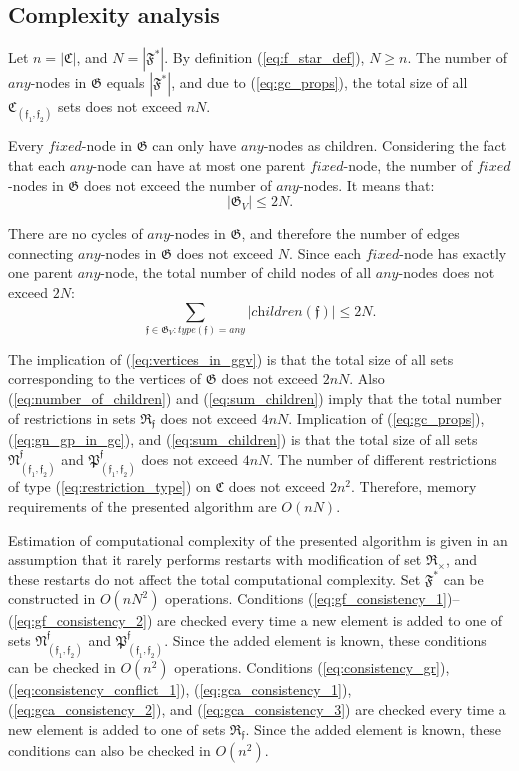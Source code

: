 \documentclass[times, 10pt,twocolumn]{article}
\newcommand{\gC}{\mathfrak{C}}
\newcommand{\gF}{\mathfrak{F}}
\newcommand{\gG}{\mathfrak{G}}
\newcommand{\gR}{\mathfrak{R}}
\newcommand{\gN}{\mathfrak{N}}
\newcommand{\gP}{\mathfrak{P}}
\newcommand{\gf}{\mathfrak{f}}
\newcommand{\gFs}{\gF^*}
\newcommand{\any}{\textit{any}}
\newcommand{\fixed}{\textit{fixed}}
\newcommand{\children}{\textit{children}}
\newcommand{\type}{\textit{type}}
\begin{document}
\subsection{Complexity analysis}

Let $n = |\gC|$, and $N = |\gFs|$.
By definition (\ref{eq:f_star_def}), $N \ge n$.
The number of $\any$-nodes in $\gG$ equals $|\gFs|$,
and due to (\ref{eq:gc_props}),
the total size of all $\gC_{(\gf_1, \gf_2)}$ sets does not exceed $nN$.

Every $\fixed$-node in $\gG$ can only have $\any$-nodes as children. Considering the fact that each $\any$-node can have at most one parent $\fixed$-node, the number of $\fixed$-nodes in $\gG$ does not exceed the number of $\any$-nodes. It means that:
\begin{equation}\label{eq:vertices_in_ggv}
|\gG_V| \le 2N \text{.}
\end{equation}

There are no cycles of $\any$-nodes in $\gG$,
and therefore the number of edges connecting $\any$-nodes in $\gG$
does not exceed $N$.
Since each $\fixed$-node has exactly one parent $\any$-node,
the total number of child nodes of all $\any$-nodes does not exceed $2N$:
\begin{equation}\label{eq:sum_children}
\sum_{\gf \in \gG_V: \type(\gf) = \any} |\children(\gf)| \le 2N \text{.}
\end{equation}

The implication of (\ref{eq:vertices_in_ggv})
is that the total size of all sets corresponding to the vertices of $\gG$
does not exceed $2nN$.
Also (\ref{eq:number_of_children}) and (\ref{eq:sum_children}) imply
that the total number of restrictions in sets $\gR_{\gf}$ does not exceed $4nN$.
Implication of (\ref{eq:gc_props}), (\ref{eq:gn_gp_in_gc}),
and (\ref{eq:sum_children}) is that the total size
of all sets $\gN^{\gf}_{(\gf_1, \gf_2)}$ and $\gP^{\gf}_{(\gf_1, \gf_2)}$
does not exceed $4nN$.
The number of different restrictions of type (\ref{eq:restriction_type})
on $\gC$ does not exceed $2n^2$.
Therefore, memory requirements of the presented algorithm are $O(nN)$.

Estimation of computational complexity of the presented algorithm is given
in an assumption that it rarely performs restarts
with modification of set $\gR_{\times}$,
and these restarts do not affect the total computational complexity.
Set $\gFs$ can be constructed in $O(nN^2)$ operations.
Conditions (\ref{eq:gf_consistency_1})--(\ref{eq:gf_consistency_2})
are checked every time a new element is added to one
of sets $\gN^{\gf}_{(\gf_1, \gf_2)}$ and $\gP^{\gf}_{(\gf_1, \gf_2)}$.
Since the added element is known,
these conditions can be checked in $O(n^2)$ operations.
Conditions (\ref{eq:consistency_gr}), (\ref{eq:consistency_conflict_1}),
(\ref{eq:gca_consistency_1}), (\ref{eq:gca_consistency_2}),
and (\ref{eq:gca_consistency_3}) are checked every time a new element
is added to one of sets $\gR_{\gf}$.
Since the added element is known,
these conditions can also be checked in $O(n^2)$.
\end{document}
